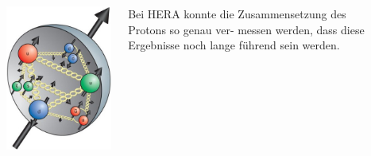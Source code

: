 \documentclass[10pt,t]{beamer}
\begin{document}
\begin{frame}
\begin{columns}
\begin{minipage}[c]{0.35\textwidth}
    \includegraphics[width=\textwidth]{hera-proton2}
\end{minipage}
\hfill
\begin{minipage}[c]{0.6\textwidth}\raggedright
Bei HERA konnte die Zusammensetzung des Protons so genau ver- messen werden, dass diese Ergebnisse noch lange führend sein werden.
\end{minipage}
~\\[-\baselineskip]

\end{columns}
\end{frame}
\end{document}
